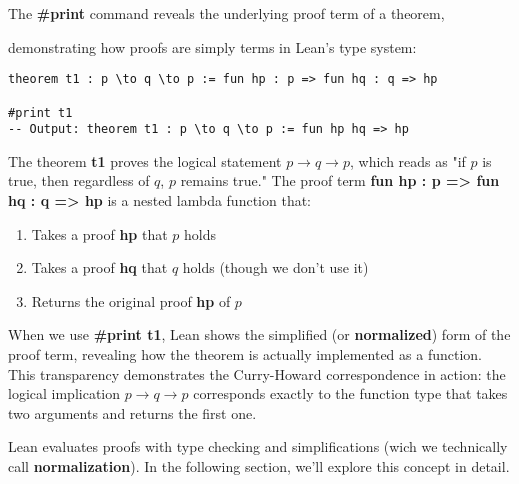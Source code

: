 \begin{example}
    The \textbf{\#print} command reveals the underlying proof term of a theorem,
 
    demonstrating how proofs are simply terms in Lean's type system:

\begin{lstlisting}[language=Lean]
theorem t1 : p \to q \to p := fun hp : p => fun hq : q => hp

#print t1
-- Output: theorem t1 : p \to q \to p := fun hp hq => hp
\end{lstlisting}

 The theorem \textbf{t1} proves the logical statement $p \to q \to p$, which reads as "if $p$ is true, then regardless of $q$, $p$ remains true." The proof term \textbf{fun hp : p => fun hq : q => hp} is a nested lambda function that:

\begin{enumerate}
\item Takes a proof \textbf{hp} that $p$ holds
\item Takes a proof \textbf{hq} that $q$ holds (though we don't use it)
\item Returns the original proof \textbf{hp} of $p$
\end{enumerate}

When we use \textbf{\#print t1}, Lean shows the simplified (or \textbf{normalized}) form of the proof term, revealing how the theorem is actually implemented as a function. This transparency demonstrates the Curry-Howard correspondence in action: the logical implication $p \to q \to p$ corresponds exactly to the function type that takes two arguments and returns the first one.
\end{example}


Lean evaluates proofs with type checking and simplifications (wich we technically call \textbf{normalization}).
In the following section, we’ll explore this concept in detail.
